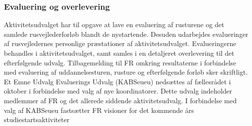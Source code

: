 \subsubsection{Evaluering og overlevering}
Aktivitetsudvalget har til opgave at lave en evaluering af rusturene og det samlede rusvejlederforløb blandt de nystartende. Desuden udarbejdes evalueringer af rusvejledernes personlige præstationer af aktivitetsudvalget. Evalueringerne behandles i aktivitetsudvalget, samt samles i en detaljeret overlevering til det efterfølgende udvalg. Tilbagemelding til FR omkring resultaterne i forbindelse med evaluering af uddannelsesturen, rusture og efterfølgende forløb sker skriftligt. Et Emne Udvalg Evaluerings Udvalg (KABSeueu) nedsættes af fællesrådet i oktober i forbindelse med valg af nye koordinatorer. Dette udvalg indeholder medlemmer af FR og det allerede siddende aktivitetsudvalg. I forbindelse med valg af KABSeueu fastsætter FR visioner for det kommende års studiestartsaktiviteter